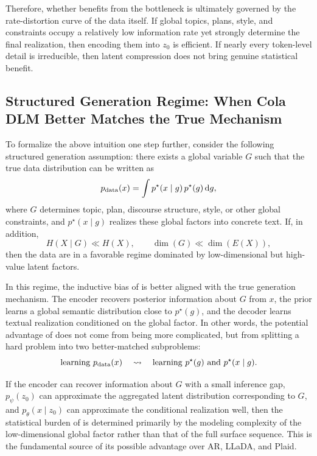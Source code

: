 Therefore, whether \method benefits from the bottleneck is ultimately governed by the rate-distortion curve of the data itself. If global topics, plans, style, and constraints occupy a relatively low information rate yet strongly determine the final realization, then encoding them into $z_0$ is efficient. If nearly every token-level detail is irreducible, then latent compression does not bring genuine statistical benefit.

\subsection{Structured Generation Regime: When Cola DLM Better Matches the True Mechanism}
\label{app:structured_generation}

To formalize the above intuition one step further, consider the following structured generation assumption: there exists a global variable $G$ such that the true data distribution can be written as
\begin{equation}
p_{\mathrm{data}}(x)=\int p^{\star}(x\mid g)\,p^{\star}(g)\,\mathrm{d} g,
\label{eq:app_global_local_factorization}
\end{equation}
where $G$ determines topic, plan, discourse structure, style, or other global constraints, and $p^{\star}(x\mid g)$ realizes these global factors into concrete text. If, in addition,
\begin{equation}
H(X\mid G)\ll H(X),
\qquad
\dim(G)\ll \dim(E(X)),
\label{eq:app_good_latent_regime}
\end{equation}
then the data are in a favorable regime dominated by low-dimensional but high-value latent factors.

In this regime, the inductive bias of \method is better aligned with the true generation mechanism. The encoder recovers posterior information about $G$ from $x$, the prior learns a global semantic distribution close to $p^{\star}(g)$, and the decoder learns textual realization conditioned on the global factor. In other words, the potential advantage of \method does not come from being more complicated, but from splitting a hard problem into two better-matched subproblems:
\begin{equation}
\text{learning }p_{\mathrm{data}}(x)
\quad\leadsto\quad
\text{learning }p^{\star}(g)
\text{ and }
p^{\star}(x\mid g).
\label{eq:app_global_local_problem_split}
\end{equation}

If the encoder can recover information about $G$ with a small inference gap, $p_{\psi}(z_0)$ can approximate the aggregated latent distribution corresponding to $G$, and $p_{\theta}(x\mid z_0)$ can approximate the conditional realization well, then the statistical burden of \method is determined primarily by the modeling complexity of the low-dimensional global factor rather than that of the full surface sequence. This is the fundamental source of its possible advantage over AR, LLaDA, and Plaid.

